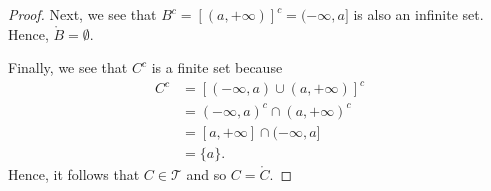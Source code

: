 \documentclass[a4paper]{article}
\begin{document}
\begin{problem}
\begin{enumerate}
\begin{enumerate}
\begin{proof}
                      Next, we see that \( B^{c} = [(a, + \infty)]^{c} = (-\infty , a]  \) is also an infinite set. Hence, \( \mathring{B} = \emptyset \).

                      Finally, we see that \( C^{c} \) is a finite set because 
                        \begin{align*}
                            C^{c} &= [(-\infty , a) \cup (a,+\infty )]^{c} \\
                                  &= (-\infty , a)^{c} \cap (a, + \infty )^{c} \\
                                  &= [a,+\infty ] \cap (-\infty , a] \\
                                  &= \{ a \}.
                        \end{align*}
                        Hence, it follows that \( C \in \mathcal{T} \) and so \( C = \mathring{C} \).
                  \end{proof}
          \end{enumerate}
  \end{enumerate}  
\end{problem}
\end{document}
